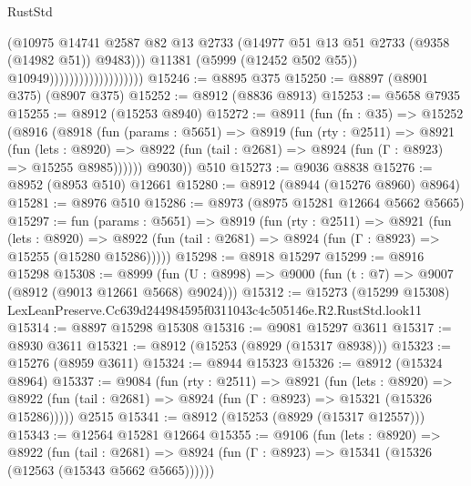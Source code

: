 \begin{lexlean}{RustStd}
\begin{coremodule}
                                            (@10975
                                              @14741
                                              @2587
                                              @82
                                              @13
                                              @2733
                                              (@14977
                                                @51
                                                @13
                                                @51
                                                @2733
                                                (@9358 (@14982 @51))
                                                @9483)))
                                          @11381
                                          (@5999 (@12452 @502 @55))
                                          @10949)))))))))))))))))))
@15246 := @8895 @375
@15250 := @8897 (@8901 @375) (@8907 @375)
@15252 := @8912 (@8836 @8913)
@15253 := @5658 @7935
@15255 := @8912 (@15253 @8940)
@15272 := @8911
    (fun (fn : @35) =>
    @15252
      (@8916
        (@8918
          (fun (params : @5651) =>
          @8919
            (fun (rty : @2511) =>
            @8921
              (fun (lets : @8920) =>
              @8922 (fun (tail : @2681) => @8924 (fun (Γ : @8923) => @15255 @8985))))))
        @9030))
    @510
@15273 := @9036 @8838
@15276 := @8952 (@8953 @510) @12661
@15280 := @8912 (@8944 (@15276 @8960) @8964)
@15281 := @8976 @510
@15286 := @8973 (@8975 @15281 @12664 @5662 @5665)
@15297 := fun (params : @5651) =>
  @8919
    (fun (rty : @2511) =>
    @8921
      (fun (lets : @8920) =>
      @8922 (fun (tail : @2681) => @8924 (fun (Γ : @8923) => @15255 (@15280 @15286)))))
@15298 := @8918 @15297
@15299 := @8916 @15298
@15308 := @8999
    (fun (U : @8998) => @9000 (fun (t : @7) => @9007 (@8912 (@9013 @12661 @5668) @9024)))
@15312 := @15273 (@15299 @15308) LexLeanPreserve.Cc639d244984595f0311043c4c505146e.R2.RustStd.look11
@15314 := @8897 @15298 @15308
@15316 := @9081 @15297 @3611
@15317 := @8930 @3611
@15321 := @8912 (@15253 (@8929 (@15317 @8938)))
@15323 := @15276 (@8959 @3611)
@15324 := @8944 @15323
@15326 := @8912 (@15324 @8964)
@15337 := @9084
    (fun (rty : @2511) =>
    @8921
      (fun (lets : @8920) =>
      @8922 (fun (tail : @2681) => @8924 (fun (Γ : @8923) => @15321 (@15326 @15286)))))
    @2515
@15341 := @8912 (@15253 (@8929 (@15317 @12557)))
@15343 := @12564 @15281 @12664
@15355 := @9106
    (fun (lets : @8920) =>
    @8922
      (fun (tail : @2681) =>
      @8924 (fun (Γ : @8923) => @15341 (@15326 (@12563 (@15343 @5662 @5665))))))

\end{coremodule}
\end{lexlean}
